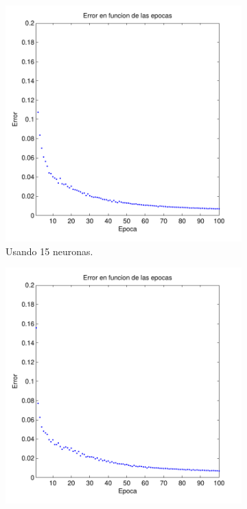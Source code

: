 \documentclass[informe.tex]{subfiles}
\begin{document}
    \begin{figure}[H]
        \centering
        \begin{subfigure}[b]{0.32\textwidth}
                \includegraphics[width=\textwidth]{graficos/error_fold1_15_binary_100_04.pdf}
                \caption{Usando 15 neuronas.}
                \label{fig:d1-f1-04-n15}
        \end{subfigure}
        \begin{subfigure}[b]{0.32\textwidth}
                \includegraphics[width=\textwidth]{graficos/error_fold1_20_binary_100_04.pdf}

\end{subfigure}
\end{figure}
\end{document}
